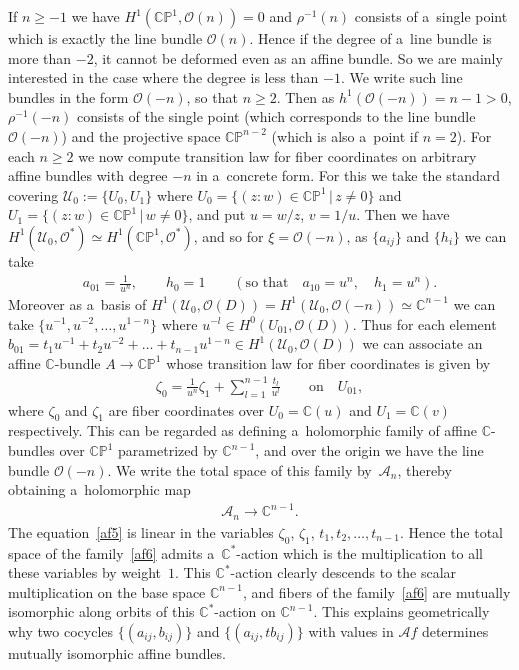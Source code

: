 \documentclass[pdftex]{sigma}
\numberwithin{equation}{section}
\begin{document}
If $n\ge -1$ we have $H^1(\mathbb{CP}^1,\mathscr O(n))=0$ and $\rho^{-1}(n)$ consists of a~single point which is exactly
the line bundle $\mathscr O(n)$.
Hence if the degree of a~line bundle is more than $-2$, it cannot be deformed even as an af\/f\/ine bundle.
So we are mainly interested in the case where the degree is less than $-1$.
We write such line bundles in the form $\mathscr O(-n)$, so that $n\ge 2$.
Then as $h^1(\mathscr O(-n)) = n-1>0$, $\rho^{-1}(-n)$ consists of the single point (which corresponds to the line
bundle $\mathscr O(-n)$) and the projective space $\mathbb{CP}^{n-2}$ (which is also a~point if $n=2$).
For each $n\ge 2$ we now compute transition law for f\/iber coordinates on arbitrary af\/f\/ine bundles with degree $-n$
in a~concrete form.
For this we take the standard covering $\mathscr U_0:=\{U_0,U_1\}$ where $U_0 =\{(z:w)\in\mathbb{CP}^1\,|\, z\neq 0\}$
and $U_1 =\{(z:w)\in\mathbb{CP}^1\,|\, w\neq 0\}$, and put $u = w/z$, $v=1/u$.
Then we have $H^1(\mathscr U_0,\mathscr O^*)\simeq H^1(\mathbb{CP}^1, \mathscr O^*)$, and so for $\xi=\mathscr O(-n)$,
as $\{a_{ij}\}$ and $\{h_i\}$ we can take
\begin{gather*}
a_{01} = \frac 1{u^n},
\qquad
h_0 =1
\qquad
(\text{so that}
\quad
a_{10} = u^n,
\quad
h_1 = {u^n}).
\end{gather*}
Moreover as a~basis of $H^1(\mathscr U_0,\mathscr O(D)) \!=\!H^1(\mathscr U_0,\mathscr O(-n))\!\simeq\! \mathbb{C}^{n-1}$ we can
take $\{u^{-1},u^{-2},\dots,u^{1-n}\}$ where $u^{-l}\in H^0(U_{01},\mathscr O(D))$.
Thus for each element $b_{01}=t_1u^{-1}+t_2u^{-2} + \dots + t_{n-1} u^{1-n}\in H^1(\mathscr U_0,\mathscr O(D))$ we can
associate an af\/f\/ine $\mathbb{C}$-bundle $A\to\mathbb{CP}^1$ whose transition law for f\/iber coordinates is given by
\begin{gather}
\label{af5}
\zeta_0 = \frac 1{u^n} \zeta_1 + \sum\limits_{l=1}^{n-1} \frac {t_l} {u^l}
\qquad
\text{on}
\quad
U_{01},
\end{gather}
where $\zeta_0$ and $\zeta_1$ are f\/iber coordinates over $U_0=\mathbb{C}(u)$ and $U_1=\mathbb{C}(v)$ respectively.
This can be regarded as def\/ining a~holomorphic family of af\/f\/ine $\mathbb{C}$-bundles over $\mathbb{CP}^1$
parametrized by $\mathbb{C}^{n-1}$, and over the origin we have the line bundle $\mathscr O(-n)$.
We write the total space of this family by~$\mathscr A_n$, thereby obtaining a~holomorphic map
\begin{gather}
\label{af6}
\mathscr A_n\to\mathbb{C}^{n-1}.
\end{gather}
The equation~\eqref{af5} is linear in the variables $\zeta_0$, $\zeta_1$, $t_1,t_2,\dots,t_{n-1}$.
Hence the total space of the family~\eqref{af6} admits a~$\mathbb{C}^*$-action which is the multiplication to all these
variables by weight~$1$.
This $\mathbb{C}^*$-action clearly descends to the scalar multiplication on the base space $\mathbb{C}^{n-1}$, and
f\/ibers of the family~\eqref{af6} are mutually isomorphic along orbits of this $\mathbb{C}^*$-action on
$\mathbb{C}^{n-1}$.
This explains geometrically why two cocycles $\{(a_{ij},b_{ij})\}$ and $\{(a_{ij},tb_{ij})\}$ with values in $\mathscr
Af$ determines mutually isomorphic af\/f\/ine bundles.
\end{document}
